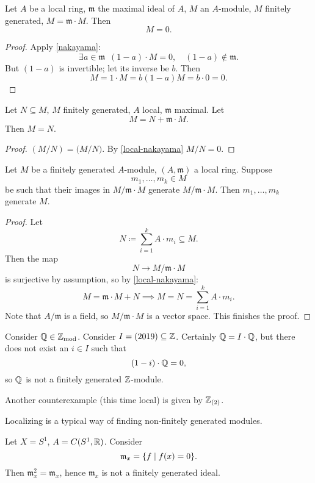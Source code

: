\begin{corollary}
  \label{local-nakayama}
  Let $A$ be a local ring, $\mathfrak m$ the maximal ideal of $A$, $M$ an $A$-module, $M$ finitely generated, $M = \mathfrak m \cdot M$. Then
  \[ M = 0.\]
\end{corollary}
\begin{proof}
  Apply \cref{nakayama}:
  \[ \exists a \in \mathfrak m \enspace (1-a) \cdot M = 0, \quad (1-a) \notin \mathfrak m.\]
  But $(1 - a)$ is invertible; let its inverse be $b$. Then
  \[ M = 1 \cdot M = b(1-a) M = b \cdot 0 = 0.\]
\end{proof}

\begin{corollary}
  \label{local-nakayama2}
  Let $N \subseteq M$, $M$ finitely generated, $A$ local, $\mathfrak m$ maximal. Let
  \[ M = N + \mathfrak m \cdot M.\]
  Then $M = N$.
\end{corollary}
\begin{proof}
  $(M / {N}) = \mathfrak (M / {N})$.
  By \cref{local-nakayama}
  $M / {N} = 0$.
\end{proof}

\begin{corollary}
  Let $M$ be a finitely generated $A$-module, $(A, \mathfrak m)$ a local ring. Suppose
  \[ m_1, \dotsc, m_k \in M\]
  be such that their images in $M / {\mathfrak m \cdot M}$ generate $M / {\mathfrak m \cdot M}$. Then $m_1, \dotsc, m_k$ generate $M$.
\end{corollary}
\begin{proof}
  Let
  \[ N \coloneqq \sum_{i=1}^k A \cdot m_i \subseteq M.\]
  Then the map
  \[ N \to M / {\mathfrak m \cdot M}\]
  is surjective by assumption, so by \cref{local-nakayama}:
  \[ M = \mathfrak m \cdot M + N \implies M = N = \sum_{i=1}^k A \cdot m_i.\]
  Note that
  $A / {\mathfrak m}$
  is a field, so
  $M / {\mathfrak m \cdot M}$
  is a vector space. This finishes the proof.
\end{proof}

\begin{example}
  Consider $\mathbb Q \in \mathbb Z_\text{mod}$. Consider $I = (2019) \subseteq \mathbb Z$.
  Certainly $\mathbb Q = I \cdot \mathbb Q$, but there does not exist an $i \in I$ such that
  \[ (1-i) \cdot \mathbb Q = 0,\]
  so $\mathbb Q$ is not a finitely generated $\mathbb Z$-module. 
\end{example}

\begin{example}
  Another counterexample (this time local) is given by $\mathbb Z_{(2)}$.
\end{example}

\begin{note}
  Localizing is a typical way of finding non-finitely generated modules.
\end{note}

\begin{example}
  Let $X = S^1$, $A = C(S^1, \mathbb R)$. Consider
  \[ \mathfrak m_x = \{ f \mathrel{|} f(x) = 0 \}. \]
  Then $\mathfrak m_x^2 = \mathfrak m_x$, hence $\mathfrak m_x$ is not a finitely generated ideal.
\end{example}


